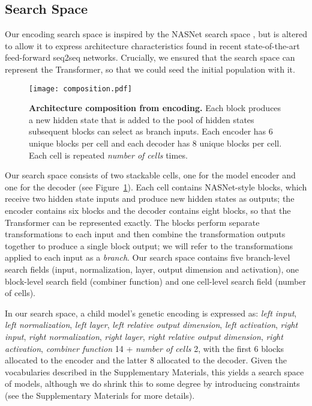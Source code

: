 \documentclass{article}
\begin{document}
\subsection{Search Space}
Our encoding search space is inspired by the NASNet search space \cite{zoph18}, but is altered to allow it to express architecture characteristics found in recent state-of-the-art feed-forward seq2seq networks.
Crucially, we ensured that the search space can represent the Transformer, so that we could seed the initial population with it.


\begin{figure}[h!]
\vspace{-0.1in}
\begin{center}
\centerline{\texttt{[image: composition.pdf]}}
\caption{\textbf{Architecture composition from encoding.} Each block produces a new hidden state that is added to the pool of hidden states subsequent blocks can select as branch inputs. Each encoder has 6 unique blocks per cell and each decoder has 8 unique blocks per cell. Each cell is repeated \textit{number of cells} times.}
\label{fig:ss}
\end{center}
\vspace{-0.25in}
\end{figure}

Our search space consists of two stackable cells, one for the model encoder and one for the decoder (see Figure~\ref{fig:ss}). Each cell contains NASNet-style blocks, which receive two hidden state inputs and produce new hidden states as outputs; the encoder contains six blocks and the decoder contains eight blocks, so that the Transformer can be represented exactly. The blocks perform separate transformations to each input and then combine the transformation outputs together to produce a single block output; we will refer to the transformations applied to each input as a \textit{branch}. Our search space contains five branch-level search fields (input, normalization, layer, output dimension and activation), one block-level search field (combiner function) and one cell-level search field (number of cells). 


In our search space, a child model's genetic encoding is expressed as: \textit{left input}, \textit{left normalization}, \textit{left layer}, \textit{left relative output dimension}, \textit{left activation}, \textit{right input}, \textit{right normalization}, \textit{right layer}, \textit{right relative output dimension}, \textit{right activation}, \textit{combiner function}  14 + \textit{number of cells}  2, with the first 6 blocks allocated to the encoder and the latter 8 allocated to the decoder. Given the vocabularies described in the Supplementary Materials, this yields a search space of  models, although we do shrink this to some degree by introducing constraints (see the Supplementary Materials for more details).
\end{document}
